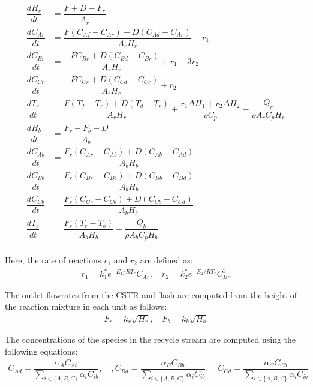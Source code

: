 \documentclass[10pt]{article}
\begin{document}
\begin{align*}
  \dfrac{dH_r}{dt} &= \dfrac{F + D -F_r}{A_r}\\
  \dfrac{dC_{Ar}}{dt} &= \dfrac{F(C_{Af} -C_{Ar}) +
                         D(C_{Ad} -C_{Ar})}{A_rH_r} - r_1 \\
  \dfrac{dC_{Br}}{dt} &= \dfrac{-FC_{Br} + 
                          D(C_{Bd} -C_{Br})}{A_rH_r} + r_1 -3r_2\\
  \dfrac{dC_{Cr}}{dt} &= \dfrac{-FC_{Cr} + 
  D(C_{Cd} -C_{Cr})}{A_rH_r} + r_2\\
  \dfrac{dT_r}{dt} &= \dfrac{F(T_f - T_r) + D(T_d -T_r)}{A_rH_r} + 
                      \dfrac{r_1\Delta H_1 + r_2\Delta H_2}{\rho C_p} - 
                      \dfrac{Q_r}{\rho A_r C_p H_r}\\
  \dfrac{dH_b}{dt} &= \dfrac{F_r - F_b - D}{A_b} \\
  \dfrac{dC_{Ab}}{dt} &= \dfrac{F_r(C_{Ar} -C_{Ab}) + 
                          D(C_{Ab} -C_{Ad})}{A_bH_b} \\
  \dfrac{dC_{Bb}}{dt} &= \dfrac{F_r(C_{Br} -C_{Bb}) + 
                          D(C_{Bb} -C_{Bd})}{A_bH_b} \\
  \dfrac{dC_{Cb}}{dt} &= \dfrac{F_r(C_{Cr} -C_{Cb}) + 
                          D(C_{Cb} -C_{Cd})}{A_bH_b} \\
  \dfrac{dT_b}{dt} &= \dfrac{F_r(T_r - T_b)}{A_bH_b} +
                      \dfrac{Q_b}{\rho A_b C_p H_b}\\
\end{align*}

Here, the rate of reactions $r_1$ and $r_2$ are defined as:
\begin{align*}
  r_1 = k_1^*e^{-E_1/RT_r}C_{Ar}, \quad r_2 = k_2^*e^{-E_2/RT_r}C_{Br}^3
\end{align*}

The outlet flowrates from the CSTR and flash are computed from the height of the reaction mixture in each unit as follows:
\begin{align*}
  F_r = k_r\sqrt{H_r}, \quad F_b = k_b\sqrt{H_b}
\end{align*}

The concentrations of the species in the recycle stream are computed using the following equations:
\begin{align*}
  C_{Ad} = \dfrac{\alpha_A C_{Ab}}{\sum_{i \in \{ A, B, C\}} \alpha_iC_{ib}} , \quad, C_{Bd} = \dfrac{\alpha_B C_{Bb}}{\sum_{i \in \{ A, B, C\}} \alpha_iC_{ib}}, \quad C_{Cd} = \dfrac{\alpha_C C_{Cb}}{\sum_{i \in \{ A, B, C\}} \alpha_iC_{ib}}
\end{align*}
\end{document}
